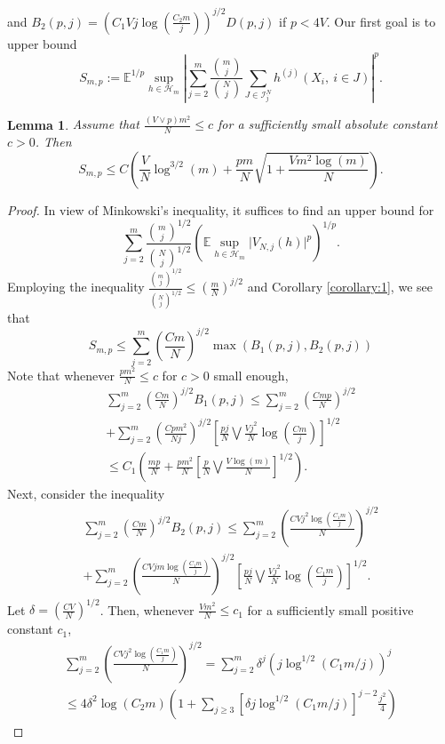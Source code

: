 \documentclass[12pt]{article}
\def\l{\left}
\def\r{\right}
\newcommand{\m}{\mathcal}
\newcommand{\mb}{\mathbb}
\newcommand{\scolor}[1]{\textcolor{red}{#1}} %
\newtheorem{lemma}{Lemma}
\theoremstyle{thmstyletwo}%
\theoremstyle{thmstylethree}%
\begin{document}
and $B_2(p,j) = \l(C_1V j\log\l(\frac{C_2m}{j}\r) \r)^{j/2} D(p,j)$ if $p<4V$. 
Our first goal is to upper bound 
\[
S_{m,p}:=\mb E^{1/p}\sup_{h\in \m H_m}\l|\sum_{j=2}^m \frac{{m \choose j}}{{N \choose j}} \sum_{J \in \mathcal{I}^N_j} h^{(j)}\l(X_i,\  i \in J\r)\r|^p.
\]
\begin{lemma}
\label{lemma:higher-order}
    Assume that $\frac{(V\vee p)m^2}{N}\leq c$ for a sufficiently small absolute constant $c>0$. Then
    \[
    S_{m,p} \leq C\l( \frac{V}{N}\log^{3/2}(m) + \frac{pm}{N}\sqrt{1+\frac{Vm^2\log(m)}{N}}\r).
    \]
\end{lemma}
\begin{proof}
    In view of Minkowski's inequality, it suffices to find an upper bound for
    \[
    \sum_{j=2}^m \frac{{m \choose j}^{1/2}}{{N\choose j}^{1/2}}\l(\mb E \sup_{h \in \mathcal{H}_m} \lvert V_{N,j}(h) \rvert^p \r)^{1/p}.
    \]
Employing the inequality $\frac{{m \choose j}^{1/2}}{{N\choose j}^{1/2}}\leq \l(\frac{m}{N}\r)^{j/2}$ and Corollary \ref{corollary:1}, we see that 
\[
S_{m,p}\leq \sum_{j=2}^m \l(\frac{Cm}{N}\r)^{j/2}\max\l( B_1(p,j),B_2(p,j)\r)
\]
Note that whenever $\frac{pm^2}{N}\leq c$ for $c>0$ small enough,
\begin{multline}
\label{eq:B_1}
\sum_{j=2}^m \l(\frac{Cm}{N}\r)^{j/2} B_1(p,j)
\leq 
\sum_{j=2}^m \l(\frac{Cmp}{N}\r)^{j/2}
\\
+ \sum_{j=2}^m \l(\frac{Cpm^2}{Nj}\r)^{j/2} \l[\frac{pj}{N}\bigvee \frac{Vj^2}{N}\log\l(\frac{Cm}{j}\r)\r]^{1/2}
\\
\leq C_1\l( \frac{mp}{N} + \frac{pm^2}{N} \l[\frac{p}{N}\bigvee \frac{V\log(m)}{N}\r]^{1/2}\r).
\end{multline}
Next, consider the inequality
\begin{multline*}
    \sum_{j=2}^m \l(\frac{Cm}{N}\r)^{j/2} B_2(p,j) \leq 
    \sum_{j=2}^m \l(\frac{CVj^2 \log\l( \frac{C_1m}{j} \r)}{N}\r)^{j/2}
    \\
    +\sum_{j=2}^m \l(\frac{CVjm\log\l( \frac{C_1m}{j} \r)}{N}\r)^{j/2}\l[\frac{pj}{N}\bigvee \frac{Vj^2}{N}\log\l(\frac{C_1m}{j}\r)\r]^{1/2}.
\end{multline*}
Let $\delta=\l(\frac{CV}{N}\r)^{1/2}$. Then, whenever $\frac{Vm^2}{N}\leq c_1$ for a sufficiently small positive constant $c_1$,
\begin{multline*}    
\sum_{j=2}^m \l(\frac{CVj^2 \log\l( \frac{C_1m}{j} \r)}{N}\r)^{j/2} = \sum_{j=2}^m \delta^j \l(j\log^{1/2}\l(C_1m/j\r)\r)^j 
\\
\leq 4\delta^2 \log\l(C_2 m\r) \l(1 + \sum_{j\geq 3} \l[\delta j \log^{1/2}\l(C_1m/j\r)\r]^{j-2}\frac{j^2}{4}\r)

\end{multline*}
\end{proof}
\end{document}
